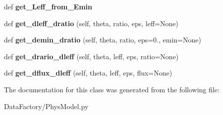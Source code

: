 \begin{DoxyCompactItemize}
def {\bfseries get\+\_\+\+Leff\+\_\+from\+\_\+\+Emin}
\item 
\mbox{\label{classMIS_1_1DataFactory_1_1PhysModel_1_1PhysicalModel_ab7dca421b47576a93e1cffd3e6704740}} 
def {\bfseries get\+\_\+dleff\+\_\+dratio} (self, theta, ratio, eps, leff=None)
\item 
\mbox{\label{classMIS_1_1DataFactory_1_1PhysModel_1_1PhysicalModel_a53acb1c0e2e4a627c925053b9573aef7}} 
def {\bfseries get\+\_\+demin\+\_\+dratio} (self, theta, ratio, eps=0., emin=None)
\item 
\mbox{\label{classMIS_1_1DataFactory_1_1PhysModel_1_1PhysicalModel_a7621d6e8baa4e9270b943a9365326781}} 
def {\bfseries get\+\_\+drario\+\_\+dleff} (self, theta, leff, eps, ratio=None)
\item 
\mbox{\label{classMIS_1_1DataFactory_1_1PhysModel_1_1PhysicalModel_adc298e0c9ea40bdafccc9eff1d000057}} 
def {\bfseries get\+\_\+dflux\+\_\+dleff} (self, theta, leff, eps, flux=None)
\end{DoxyCompactItemize}


The documentation for this class was generated from the following file\+:\begin{DoxyCompactItemize}
\item 
Data\+Factory/Phys\+Model.\+py\end{DoxyCompactItemize}

